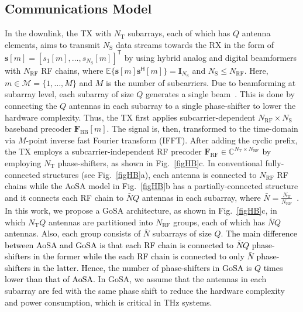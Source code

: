 \documentclass[journal,10pt]{IEEEtran}
\begin{document}
	
	
	
	
	
	\subsection{Communications Model}
	
	{\color{black}In the downlink, the TX with $N_\mathrm{T}$ subarrays, each of which has $Q$ antenna elements,  aims to transmit $N_\mathrm{S}$ data streams towards the RX in the form of $\mathbf{s}[m] = [s_1[m],\dots,s_{N_\mathrm{S}}[m]]^\textsf{T}$ by using hybrid analog and digital beamformers with $N_\mathrm{RF}$ RF chains, where $\mathbb{E}\{\mathbf{s}[m]\mathbf{s}^\textsf{H}[m]\} = \mathbf{I}_{N_\mathrm{S}}$ and $N_\mathrm{S}\leq N_\mathrm{RF}$. Here, $m \in  \mathcal{M} = \{1,\dots, M\}$ and $M$ is the number of subcarriers.} Due to beamforming at subarray level, each subarray of size $Q$ generates a single beam~\cite{ummimoTareq}. This is done by connecting the $Q$ antennas in each subarray to a single phase-shifter to lower the hardware complexity. {\color{black}Thus, the TX first applies subcarrier-dependent $N_\mathrm{RF}\times N_\mathrm{S}$ baseband precoder $\mathbf{F}_\mathrm{BB}[m]$. The signal is, then, transformed to the time-domain via $M$-point inverse fast Fourier transform	(IFFT). After adding the cyclic prefix, the TX employs
		a subcarrier-independent RF precoder $\mathbf{F}_\mathrm{RF}\in \mathbb{C}^{N_\mathrm{T}\times N_\mathrm{RF}}$ by employing $N_\mathrm{T}$ phase-shifters, as shown in Fig.~\ref{figHB}c.} In conventional fully-connected structures (see Fig.~\ref{figHB}a), each antenna is connected to $N_\mathrm{RF}$ RF chains while the AoSA model in Fig.~\ref{figHB}b has a partially-connected structure and it connects each RF chain to $\bar{N}Q$ antennas in each subarray, where $\bar{N} = \frac{N_\mathrm{T}}{N_\mathrm{RF}}$~\cite{ummimoComMagYeLi}. In this work, we propose a GoSA architecture, as shown in Fig.~\ref{figHB}c, in which $N_\mathrm{T}Q$ antennas are partitioned into $N_\mathrm{RF}$ groups, each of which has $\bar{N}Q$ antennas. Also, each group consists of $\bar{N}$ subarrays of size $Q$. \textcolor{black}{The main difference between AoSA and GoSA is that each RF chain is connected to $\bar{N}Q$ phase-shifters in the former while the each RF chain is connected to only $\bar{N}$ phase-shifters in the latter. Hence, the number of phase-shifters in GoSA is $Q$ times lower than that of AoSA.} In GoSA, we assume that the antennas in each subarray are fed with the same phase shift to reduce the hardware complexity and power consumption, which is critical in THz systems.
	
\end{document}
